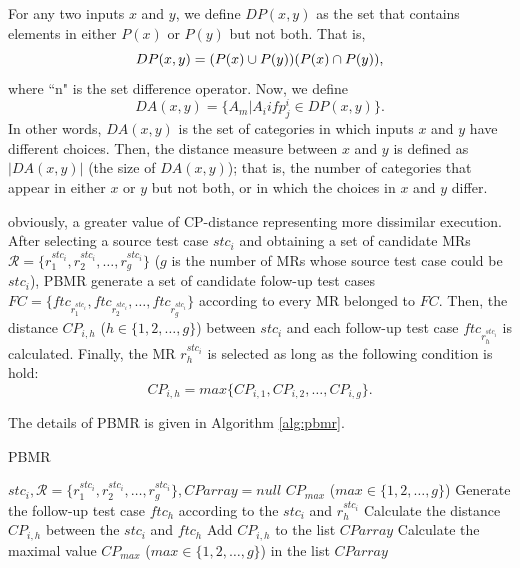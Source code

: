 \documentclass[10pt,journal,compsoc]{IEEEtran}
\begin{document}
For any two inputs $x$ and $y$, we define $DP(x,y)$ as the set that contains elements in either $P(x)$ or $P(y)$ but not both. That is,
$$DP(x,y) = (P(x) \cup P(y))\\ (P(x) \cap P(y)),$$ where ``n" is the set difference operator. Now, we define $$DA(x, y) = \{A_m|A_i if p_j^i \in DP(x, y)\}.$$ In other words, $DA(x, y)$ is the set of categories in which inputs $x$ and $y$ have different choices. Then, the distance measure between $x$ and $y$ is defined as $|DA(x, y)|$ (the size of $DA(x, y)$); that is, the number of categories that appear in either $x$ or $y$ but not both, or in which the choices in $x$ and $y$ differ.

obviously, a greater value of CP-distance representing more dissimilar execution. After selecting a source test case $stc_i$ and obtaining a set of candidate MRs $\mathcal{R} = \{r_1^{stc_i}, r_2^{stc_i}, \ldots, r_g^{stc_i}\}$ ($g$ is the number of MRs whose source test case could be $stc_i$), PBMR generate a set of candidate folow-up test cases $FC = \{ftc_{r_1^{stc_i}}, ftc_{r_2^{stc_i}}, \ldots, ftc_{r_g^{stc_i}}\}$ according to every MR belonged to $FC$. Then, the distance $CP_{i,h}$ ($h \in \{1,2, \ldots, g\}$) between $stc_i$ and each follow-up test case $ftc_{r_h^{stc_i}}$ is calculated. Finally, the MR $r_h^{stc_i}$ is selected as long as the following condition is hold:
$$CP_{i,h} = max\{CP_{i,1}, CP_{i,2}, \ldots, CP_{i,g}\}.$$

The details of PBMR is given in Algorithm \ref{alg:pbmr}.
\begin{algorithm}
\caption{PBMR}
\label{alg:pbmr}
    \begin{algorithmic}[1]
    \renewcommand{\algorithmicrequire}{\textbf{Input:}}
    \renewcommand{\algorithmicensure}{\textbf{Output:}}
    \renewcommand{\algorithmicendwhile}{\algorithmicend\_\algorithmicwhile}
    \renewcommand{\algorithmicendif}{\algorithmicend\_\algorithmicif}
    \REQUIRE $stc_i, \mathcal{R} = \{r_1^{stc_i}, r_2^{stc_i}, \ldots, r_g^{stc_i}\}, CParray = null$
    \ENSURE $CP_{max}$ ($max \in \{1, 2, \ldots, g\}$)
    \STATE Generate the follow-up test case $ftc_h$ according to the $stc_i$ and $r_h^{stc_i}$
    \STATE Calculate the distance $CP_{i,h}$ between the $stc_i$ and $ftc_h$
    \STATE Add $CP_{i,h}$ to the list $CParray$
    \ENDFOR
    \STATE Calculate the maximal value $CP_{max}$ ($max \in \{1, 2, \ldots, g\}$) in the list $CParray$
    \end{algorithmic}
\end{algorithm}
\end{document}
